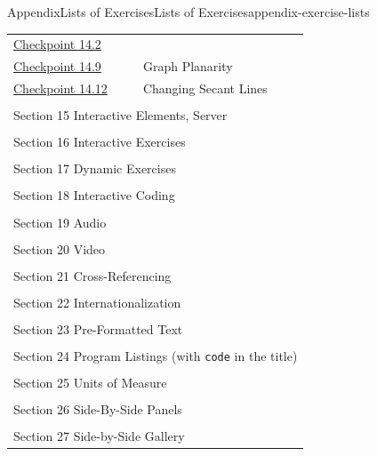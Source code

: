 \documentclass[twoside,10pt,]{article}
\newcommand{\mono}[1]{\texttt{#1}}
\numberwithin{equation}{section}
\begin{document}
\begin{appendixptx}{Appendix}{Lists of Exercises}{}{Lists of Exercises}{}{}{appendix-exercise-lists}
\begin{longtable}[l]{ll}
\hyperref[interactive-html5-canvas-5]{Checkpoint 14.2}& \\
\hyperref[section-interactive-authored-8-10]{Checkpoint 14.9}& Graph Planarity\\
\hyperref[svg-interactives-5]{Checkpoint 14.12}& Changing Secant Lines\\
\multicolumn{2}{l}{\null}\\[1.5ex] \multicolumn{2}{l}{\large Section 15 Interactive Elements, Server}\\[0.5ex]
\multicolumn{2}{l}{\null}\\[1.5ex] \multicolumn{2}{l}{\large Section 16 Interactive Exercises}\\[0.5ex]
\multicolumn{2}{l}{\null}\\[1.5ex] \multicolumn{2}{l}{\large Section 17 Dynamic Exercises}\\[0.5ex]
\multicolumn{2}{l}{\null}\\[1.5ex] \multicolumn{2}{l}{\large Section 18 Interactive Coding}\\[0.5ex]
\multicolumn{2}{l}{\null}\\[1.5ex] \multicolumn{2}{l}{\large Section 19 Audio}\\[0.5ex]
\multicolumn{2}{l}{\null}\\[1.5ex] \multicolumn{2}{l}{\large Section 20 Video}\\[0.5ex]
\multicolumn{2}{l}{\null}\\[1.5ex] \multicolumn{2}{l}{\large Section 21 Cross-Referencing}\\[0.5ex]
\multicolumn{2}{l}{\null}\\[1.5ex] \multicolumn{2}{l}{\large Section 22 Internationalization}\\[0.5ex]
\multicolumn{2}{l}{\null}\\[1.5ex] \multicolumn{2}{l}{\large Section 23 Pre-Formatted Text}\\[0.5ex]
\multicolumn{2}{l}{\null}\\[1.5ex] \multicolumn{2}{l}{\large Section 24 Program Listings (with \mono{code} in the title)}\\[0.5ex]
\multicolumn{2}{l}{\null}\\[1.5ex] \multicolumn{2}{l}{\large Section 25 Units of Measure}\\[0.5ex]
\multicolumn{2}{l}{\null}\\[1.5ex] \multicolumn{2}{l}{\large Section 26 Side-By-Side Panels}\\[0.5ex]
\multicolumn{2}{l}{\null}\\[1.5ex] \multicolumn{2}{l}{\large Section 27 Side-by-Side Gallery}\\[0.5ex]

\end{longtable}
\end{appendixptx}
\end{document}
